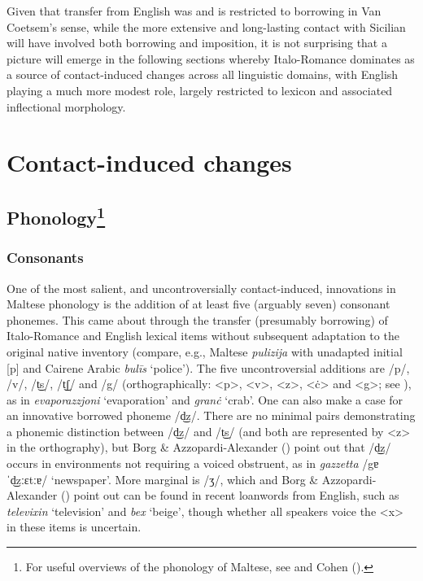 \documentclass[output=paper]{langsci/langscibook}
\begin{document}
Given that transfer from English was and is restricted to borrowing in Van Coetsem's sense, while the more extensive and long-lasting contact with Sicilian will have involved both borrowing and imposition, it is not surprising that a picture will emerge in the following sections whereby Italo-Romance dominates as a source of contact-induced changes across all linguistic domains, with English playing a much more modest role, largely restricted to lexicon and associated inflectional morphology.

\section{Contact-induced changes
}
\subsection{Phonology\footnote{\textnormal{For useful overviews of the phonology of Maltese, see \cite{Borg1997Maltese} and Cohen (\citeyear{cohen1966,Cohen1970}).}}}
\subsubsection{Consonants} %
\label{sec:311}%
One of the most salient, and uncontroversially contact-induced, innovations in Maltese phonology is the addition of at least five (arguably seven) consonant phonemes. This came about through the transfer (presumably borrowing) of Italo-Romance and English lexical items without subsequent adaptation to the original native inventory (compare, e.g., Maltese \textit{pulizija} with unadapted initial [p] and Cairene Arabic \textit{bul\={i}s} `police'). The five uncontroversial additions are /p/, /v/, /t͜s/, /t͜ʃ/ and /g/ (orthographically: <p>, <v>, <z>, <ċ> and <g>; see ), as in \textit{evaporazzjoni} `evaporation' and \textit{granċ} `crab'. One can also make a case for an innovative borrowed phoneme /d͜z/. There are no minimal pairs demonstrating a phonemic distinction between /d͜z/ and /t͜s/ (and both are represented by <z> in the orthography), but Borg \& Azzopardi-Alexander (\citeyear[301]{BorgAzzopardi-Alexander1997}) point out that /d͜z/ occurs in environments not requiring a voiced obstruent, as in \textit{gazzetta} /gɐˈd͜zːɛtːɐ/ `newspaper'. More marginal is /ʒ/, which \citet{mifsud2011} and Borg \& Azzopardi-Alexander (\citeyear[303]{BorgAzzopardi-Alexander1997}) point out can be found in recent loanwords from English, such as \textit{televixin} `television' and \textit{bex} `beige', though whether all speakers voice the <x> in these items is uncertain.
\end{document}
